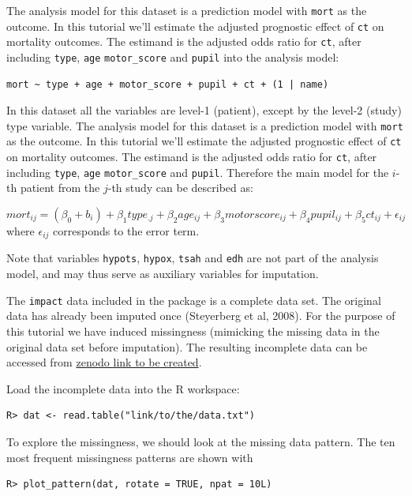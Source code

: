 \documentclass[
  article]{jss}
\begin{document}
The analysis model for this dataset is a prediction model with
\texttt{mort} as the outcome. In this tutorial we'll estimate the
adjusted prognostic effect of \texttt{ct} on mortality outcomes. The
estimand is the adjusted odds ratio for \texttt{ct}, after including
\texttt{type}, \texttt{age} \texttt{motor\_score} and \texttt{pupil}
into the analysis model:

\begin{verbatim}
mort ~ type + age + motor_score + pupil + ct + (1 | name) 
\end{verbatim}

In this dataset all the variables are level-1 (patient), except by the
level-2 (study) type variable. The analysis model for this dataset is a
prediction model with \texttt{mort} as the outcome. In this tutorial
we'll estimate the adjusted prognostic effect of \texttt{ct} on
mortality outcomes. The estimand is the adjusted odds ratio for
\texttt{ct}, after including \texttt{type}, \texttt{age}
\texttt{motor\_score} and \texttt{pupil}. Therefore the main model for
the \(i\)-th patient from the \(j\)-th study can be described as:

\[ mort_{ij} = (\beta_0 + b_i) + \beta_1type_{.j}+ \beta_2age_{ij}+ \beta_3motorscore_{ij} + \beta_4pupil_{ij} + \beta_5ct_{ij}+\epsilon_{ij}\]
where \(\epsilon_{ij}\) corresponds to the error term.

Note that variables \texttt{hypots}, \texttt{hypox}, \texttt{tsah} and
\texttt{edh} are not part of the analysis model, and may thus serve as
auxiliary variables for imputation.

The \texttt{impact} data included in the  package is a
complete data set. The original data has already been imputed once
(Steyerberg et al, 2008). For the purpose of this tutorial we have
induced missingness (mimicking the missing data in the original data set
before imputation). The resulting incomplete data can be accessed from
\href{https://zenodo.com}{zenodo link to be created}.

Load the incomplete data into the R workspace:

\begin{verbatim}
R> dat <- read.table("link/to/the/data.txt") 
\end{verbatim}

To explore the missingness, we should look at the missing data pattern.
The ten most frequent missingness patterns are shown with

\begin{verbatim}
R> plot_pattern(dat, rotate = TRUE, npat = 10L)  
\end{verbatim}
\end{document}
